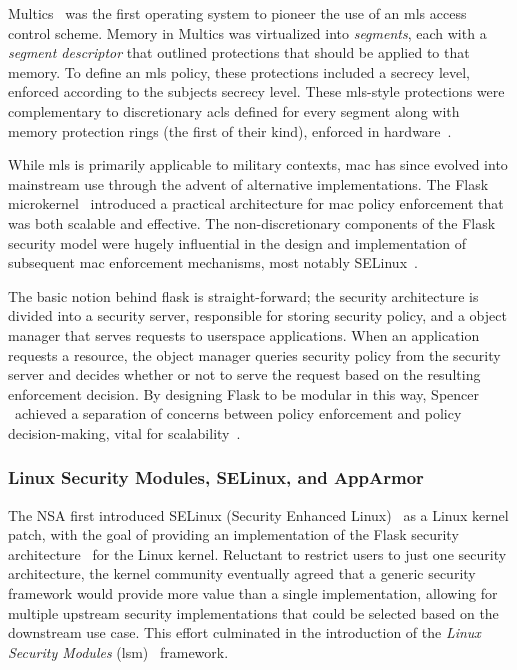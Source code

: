 Multics~\cite{vyssotsky1965_multics, corbato1965_multics} was the first operating system
to pioneer the use of an \gls{mls} access control scheme. Memory in Multics was
virtualized into \textit{segments}, each with a \textit{segment descriptor} that outlined
protections that should be applied to that memory. To define an \gls{mls} policy, these
protections included a secrecy level, enforced according to the subjects secrecy level.
These \gls{mls}-style protections were complementary to discretionary \gls{acl}s defined
for every segment along with memory protection rings (the first of their kind), enforced
in hardware~\cite{jaeger2008_os_security}.

While \gls{mls} is primarily applicable to military contexts, \gls{mac} has since evolved
into mainstream use through the advent of alternative implementations. The Flask
microkernel~\cite{spencer1999_flask} introduced a practical architecture for \gls{mac}
policy enforcement that was both scalable and effective. The non-discretionary components
of the Flask security model were hugely influential in the design and implementation of
subsequent \gls{mac} enforcement mechanisms, most notably
SELinux~\cite{smalley2001_selinux, loscocco2001_selinux}.

The basic notion behind flask is straight-forward; the security architecture is divided
into a security server, responsible for storing security policy, and a object manager that
serves requests to userspace applications. When an application requests a resource, the
object manager queries security policy from the security server and decides whether or not
to serve the request based on the resulting enforcement decision. By designing Flask to be
modular in this way, Spencer \etal~achieved a separation of concerns between policy
enforcement and policy decision-making, vital for scalability~\cite{spencer1999_flask,
smalley2001_selinux, loscocco2001_selinux}.

\subsubsection*{Linux Security Modules, SELinux, and AppArmor}

The NSA first introduced SELinux (Security Enhanced Linux)~\cite{smalley2001_selinux,
loscocco2001_selinux} as a Linux kernel patch, with the goal of providing an
implementation of the Flask security architecture~\cite{spencer1999_flask} for the Linux
kernel. Reluctant to restrict users to just one security architecture, the kernel
community eventually agreed that a generic security framework would provide more value
than a single implementation, allowing for multiple upstream security implementations that
could be selected based on the downstream use case. This effort culminated in the
introduction of the \textit{Linux Security Modules} (\gls{lsm})~\cite{wright2002_lsm} framework.

